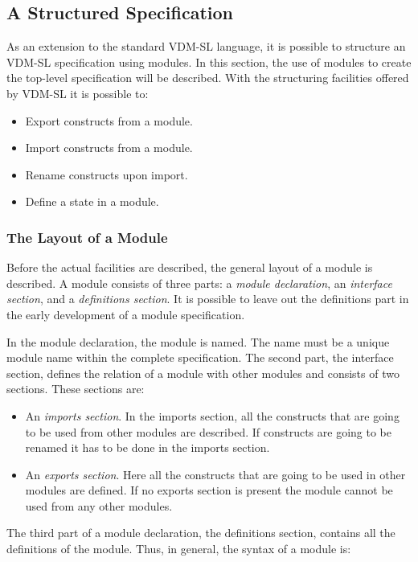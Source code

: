 \documentclass{overturerepchap}
\begin{document}
{\subsection{A Structured Specification}

As an extension to the standard VDM-SL language, it is possible to
structure an  VDM-SL specification using modules. In this section,
the use of modules to create the top-level specification will be described.
With the structuring facilities offered by  VDM-SL it is possible to:
\begin{itemize}
\item Export constructs from a module.
\item Import constructs from a module.
\item Rename constructs upon import.
\item Define a state in a module.
\end{itemize}


\subsubsection{The Layout of a Module}

Before the actual facilities are described, the general layout of a
module is described. A module consists of three parts: a {\it module
declaration}, an {\it interface section}, and a {\it definitions
section}. It is possible to leave out the definitions part in the
early development of a module specification.

In the module declaration, the module is named. The name must be a
unique module name within the complete specification. The second
part, the interface section, defines the relation of a module with other
modules and consists of two sections. These sections are:
\begin{itemize}

\item An {\it imports section}. In the imports section, all the
  constructs that are going to be used from other modules are
  described. If constructs are going to be renamed it has to be done
  in the imports section.

\item An {\it exports section}. Here all the constructs that are going
  to be used in other modules are defined.
  If no exports section is present the
  module cannot be used from any other modules.
\end{itemize}
The third part of a module declaration, the
definitions section, contains all the definitions of the module.
Thus, in general, the syntax of a module is:


}
\end{document}
